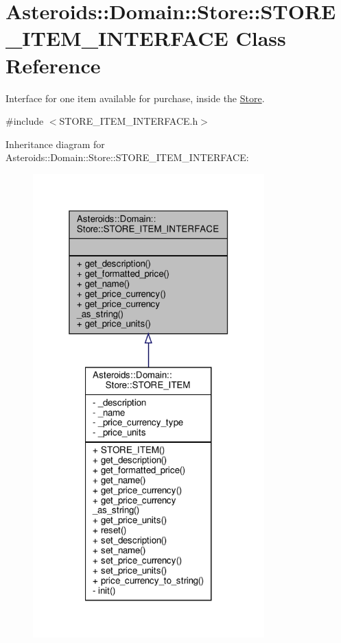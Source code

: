 \hypertarget{classAsteroids_1_1Domain_1_1Store_1_1STORE__ITEM__INTERFACE}{}\section{Asteroids\+:\+:Domain\+:\+:Store\+:\+:S\+T\+O\+R\+E\+\_\+\+I\+T\+E\+M\+\_\+\+I\+N\+T\+E\+R\+F\+A\+CE Class Reference}
\label{classAsteroids_1_1Domain_1_1Store_1_1STORE__ITEM__INTERFACE}


Interface for one item available for purchase, inside the \hyperlink{classAsteroids_1_1Domain_1_1Store_1_1Store}{Store}.  




{\ttfamily \#include $<$S\+T\+O\+R\+E\+\_\+\+I\+T\+E\+M\+\_\+\+I\+N\+T\+E\+R\+F\+A\+C\+E.\+h$>$}



Inheritance diagram for Asteroids\+:\+:Domain\+:\+:Store\+:\+:S\+T\+O\+R\+E\+\_\+\+I\+T\+E\+M\+\_\+\+I\+N\+T\+E\+R\+F\+A\+CE\+:\nopagebreak
\begin{figure}[H]
\begin{center}
\leavevmode
\includegraphics[width=253pt]{classAsteroids_1_1Domain_1_1Store_1_1STORE__ITEM__INTERFACE__inherit__graph}
\end{center}
\end{figure}


